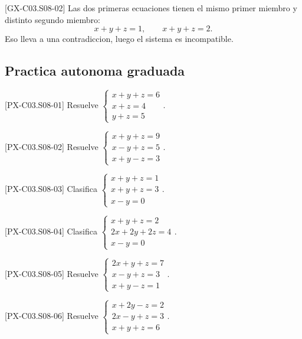 \begin{fullsolution}{[GX-C03.S08-02]}
Las dos primeras ecuaciones tienen el mismo primer miembro y distinto segundo miembro:
\[
x+y+z=1,\qquad x+y+z=2.
\]
Eso lleva a una contradiccion, luego el sistema es incompatible.
\end{fullsolution}

\subsection*{Practica autonoma graduada}
\begin{exercise}{[PX-C03.S08-01] Resuelve \(\begin{cases}x+y+z=6\\ x+z=4\\ y+z=5\end{cases}\).}
\end{exercise}
\begin{exercise}{[PX-C03.S08-02] Resuelve \(\begin{cases}x+y+z=9\\ x-y+z=5\\ x+y-z=3\end{cases}\).}
\end{exercise}
\begin{exercise}{[PX-C03.S08-03] Clasifica \(\begin{cases}x+y+z=1\\ x+y+z=3\\ x-y=0\end{cases}\).}
\end{exercise}
\begin{exercise}{[PX-C03.S08-04] Clasifica \(\begin{cases}x+y+z=2\\ 2x+2y+2z=4\\ x-y=0\end{cases}\).}
\end{exercise}
\begin{exercise}{[PX-C03.S08-05] Resuelve \(\begin{cases}2x+y+z=7\\ x-y+z=3\\ x+y-z=1\end{cases}\).}
\end{exercise}
\begin{exercise}{[PX-C03.S08-06] Resuelve \(\begin{cases}x+2y-z=2\\ 2x-y+z=3\\ x+y+z=6\end{cases}\).}
\end{exercise}

